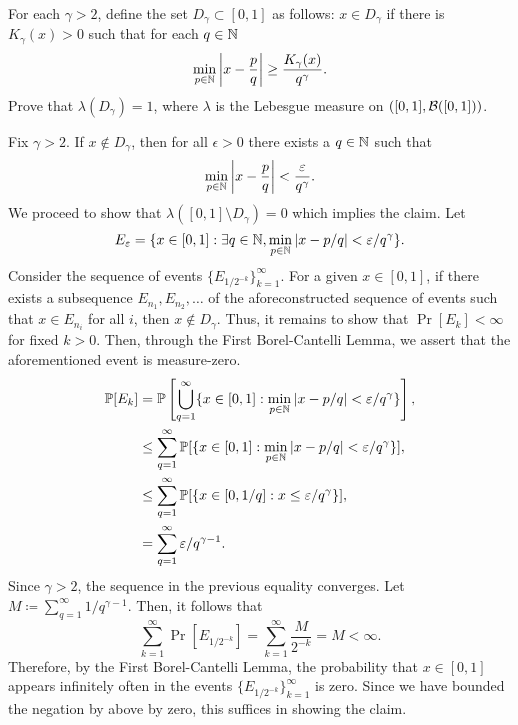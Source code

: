 \begin{problem}{4}
    For each $\gamma > 2$, define the set $D_\gamma \subset [0,1]$ as follows: $x \in D_\gamma$ if there is $K_\gamma(x) > 0$ such that for each $q \in \mathbb{N}$
    \[
        \min_{p \in\mathbb{N}} \left|x - \frac{p}{q}\right|  \geq \frac{K_\gamma(x)}{q^\gamma}.
    \]
    Prove that $\lambda(D_\gamma) =1$, where $\lambda$ is the Lebesgue measure on $([0,1], \mathcal{B}([0,1]))$.
\end{problem}
\begin{solution}


    Fix $\gamma > 2$. If $x \notin D_\gamma$, then for all $\epsilon > 0$ there exists a $q \in \mathbb{N}$ such that \[
        \min_{p \in \mathbb{N}} \left|x - \frac{p}{q}\right| < \frac{\varepsilon}{q^\gamma}.
    \]
    We proceed to show that $\lambda([0,1] \setminus D_\gamma) = 0$ which implies the claim. Let \[
    E_\varepsilon = \{x \in [0,1]: \exists q \in \mathbb{N}, \min_{p\in \mathbb{N}} |x-p/q| < \varepsilon/q^\gamma\}.
    \]
    Consider the sequence of events $\{E_{1/2^{-k}}\}_{k=1}^\infty$. For a given $x \in [0,1]$, if there exists a subsequence $E_{n_1}, E_{n_2},\ldots$ of the aforeconstructed sequence of events such that $x \in E_{n_i}$ for all $i$, then $x \notin D_\gamma$. Thus, 
    it remains to show that $\Pr[E_k] < \infty$ for fixed $k > 0$. Then, through the First Borel-Cantelli Lemma, we assert that the aforementioned event is measure-zero. 
    \begin{align*}
        \mathbb{P}[E_k] &= \mathbb{P}\left[\bigcup_{q=1}^\infty \{x \in [0,1]: \min_{p\in \mathbb{N}} |x - p/q| < \varepsilon / q^\gamma\}\right], \\
        &\leq \sum_{q=1}^\infty \mathbb{P}[\{x \in [0,1]: \min_{p\in\mathbb{N}} |x-p/q| < \varepsilon / q^\gamma\}], \\
        &\leq \sum_{q=1}^\infty \mathbb{P}[\{x \in [0,1/q]: x \leq \varepsilon / q^\gamma \}], \\
        &= \sum_{q=1}^\infty \varepsilon / q^{\gamma -1}.
    \end{align*}
    Since $\gamma > 2$, the sequence in the previous equality converges. Let $M \coloneqq \sum_{q=1}^\infty 1/q^{\gamma -1}$. Then, it follows that 
    \[
    \sum_{k = 1}^\infty \Pr[E_{1/2^{-k}}] = \sum_{k=1}^\infty \frac{M}{2^{-k}} = M < \infty. 
    \]
    Therefore, by the First Borel-Cantelli Lemma, the probability that $x\in [0,1]$ appears infinitely often in the events $\{E_{1/2^{-k}}\}_{k=1}^\infty$ is zero. Since we have bounded the negation by above by zero, this suffices in showing the claim.
\end{solution}

